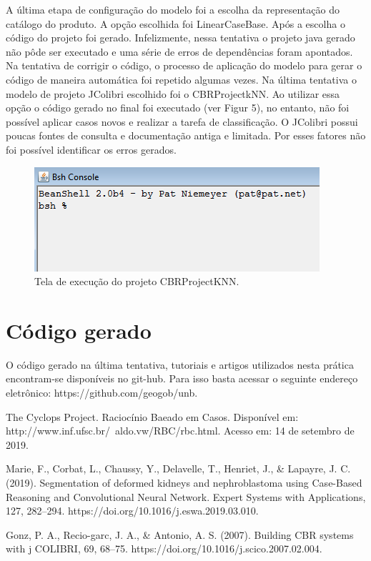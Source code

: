 \documentclass[conference]{IEEEtran}
\begin{document}
A última  etapa de configuração do modelo foi a escolha da representação do catálogo do produto. A opção escolhida foi LinearCaseBase. Após a escolha o código do projeto foi gerado. Infelizmente, nessa tentativa o projeto java gerado não pôde ser executado e uma série de erros de dependências foram apontados. Na tentativa de corrigir o código, o processo de aplicação do modelo para gerar o código de maneira automática foi repetido algumas vezes. Na última tentativa o modelo de projeto JColibri escolhido foi o CBRProjectkNN. Ao utilizar essa opção o código gerado no final foi executado (ver Figur 5), no entanto, não foi possível aplicar casos novos e realizar a tarefa de classificação. O JColibri possui poucas fontes de consulta e documentação antiga e limitada. Por esses fatores não foi possível identificar os erros gerados.

\begin{figure}[htbp]
	\centerline{\includegraphics{fig6.png}}
	\caption{Tela de execução do projeto CBRProjectKNN.}
	\label{fig5}
\end{figure}

\section*{Código gerado}

O código gerado na última tentativa, tutoriais e artigos utilizados nesta prática encontram-se disponíveis no git-hub. Para isso basta acessar o seguinte endereço eletrônico: https://github.com/geogob/unb.


\begin{thebibliography}{00}
	 The Cyclops Project. Raciocínio Baeado em Casos. Disponível em: http://www.inf.ufsc.br/~aldo.vw/RBC/rbc.html. Acesso em: 14 de setembro de 2019.
	
	  Marie, F., Corbat, L., Chaussy, Y., Delavelle, T., Henriet, J., \& Lapayre, J. C. (2019). Segmentation of deformed kidneys and nephroblastoma using Case-Based Reasoning and Convolutional Neural Network. Expert Systems with Applications, 127, 282–294. https://doi.org/10.1016/j.eswa.2019.03.010.
	
	  Gonz, P. A., Recio-garc, J. A., \& Antonio, A. S. (2007). Building CBR systems with j COLIBRI, 69, 68–75. https://doi.org/10.1016/j.scico.2007.02.004.
	
\end{thebibliography}
\end{document}

